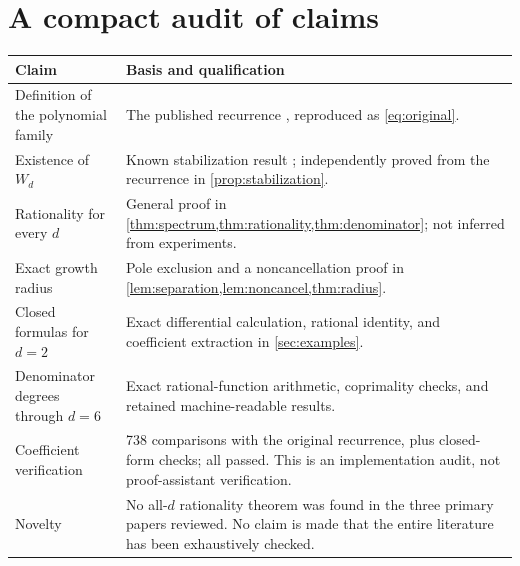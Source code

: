 \documentclass[11pt,letterpaper]{article}
\numberwithin{equation}{section}
\theoremstyle{definition}
\theoremstyle{remark}
\begin{document}
\section{A compact audit of claims}\label{app:audit}
\begin{longtable}{@{}p{}p{}@{}}
\toprule
Claim & Basis and qualification\\
\midrule
\endhead
Definition of the polynomial family & The published recurrence
\cite[Theorem 4.1]{ACS}, reproduced as \eqref{eq:original}.\\[4pt]
Existence of $W_d$ & Known stabilization result \cite{ACS}; independently
proved from the recurrence in \cref{prop:stabilization}.\\[4pt]
Rationality for every $d$ & General proof in
\cref{thm:spectrum,thm:rationality,thm:denominator}; not inferred from
experiments.\\[4pt]
Exact growth radius & Pole exclusion and a noncancellation proof in
\cref{lem:separation,lem:noncancel,thm:radius}.\\[4pt]
Closed formulas for $d=2$ & Exact differential calculation, rational
identity, and coefficient extraction in \cref{sec:examples}.\\[4pt]
Denominator degrees through $d=6$ & Exact rational-function arithmetic,
coprimality checks, and retained machine-readable results.\\[4pt]
Coefficient verification & 738 comparisons with the original recurrence,
plus closed-form checks; all passed. This is an implementation audit,
not proof-assistant verification.\\[4pt]
Novelty & No all-$d$ rationality theorem was found in the three primary
papers reviewed. No claim is made that the entire literature has been
exhaustively checked.\\
\bottomrule
\end{longtable}
\end{document}
